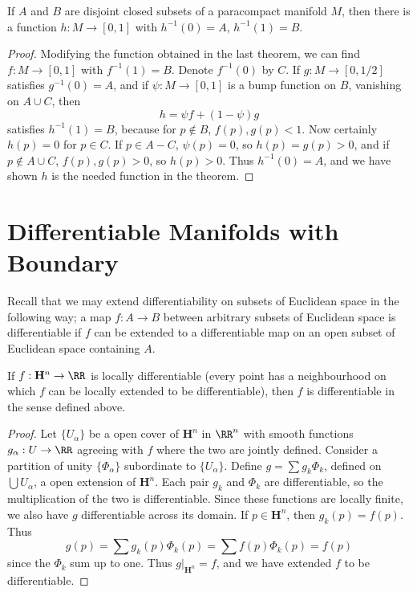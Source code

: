 \begin{corollary}
    If $A$ and $B$ are disjoint closed subsets of a paracompact manifold $M$, then there is a function $h: M \to [0,1]$ with $h^{-1}(0) = A$, $h^{-1}(1) = B$.
\end{corollary}
\begin{proof}
    Modifying the function obtained in the last theorem, we can find $f: M \to [0,1]$ with $f^{-1}(1) = B$. Denote $f^{-1}(0)$ by $C$. If $g: M \to [0,1/2]$ satisfies $g^{-1}(0) = A$, and if $\psi: M \to [0,1]$ is a bump function on $B$, vanishing on $A \cup C$, then
    \[ h = \psi f + (1 - \psi) g \]
    satisfies $h^{-1}(1) = B$, because for $p \not \in B$, $f(p), g(p) < 1$. Now certainly $h(p) = 0$ for $p \in C$. If $p \in A - C$, $\psi(p) = 0$, so $h(p) = g(p) > 0$, and if $p \not \in A \cup C$, $f(p), g(p) > 0$, so $h(p) > 0$. Thus $h^{-1}(0) = A$, and we have shown $h$ is the needed function in the theorem.
\end{proof}

\section{Differentiable Manifolds with Boundary}

Recall that we may extend differentiability on subsets of Euclidean space in the following way; a map $f: A \to B$ between arbitrary subsets of Euclidean space is differentiable if $f$ can be extended to a differentiable map on an open subset of Euclidean space containing $A$.

\begin{theorem}
    If $f:\mathbf{H}^n \to \RR$ is locally differentiable (every point has a neighbourhood on which $f$ can be locally extended to be differentiable), then $f$ is differentiable in the sense defined above.
\end{theorem}
\begin{proof}
    Let $\{ U_\alpha \}$ be a open cover of $\mathbf{H}^n$ in $\RR^n$ with smooth functions $g_\alpha:U \to \RR$ agreeing with $f$ where the two are jointly defined. Consider a partition of unity $\{ \Phi_\alpha \}$ subordinate to $\{ U_\alpha \}$. Define $g = \sum g_k \Phi_k$, defined on $\bigcup U_\alpha$, a open extension of $\mathbf{H}^n$. Each pair $g_k$ and $\Phi_k$ are differentiable, so the multiplication of the two is differentiable. Since these functions are locally finite, we also have $g$ differentiable across its domain. If $p \in \mathbf{H}^n$, then $g_k(p) = f(p)$. Thus
    \[ g(p) = \sum g_k(p) \Phi_k(p) = \sum f(p) \Phi_k(p) = f(p) \]
    since the $\Phi_k$ sum up to one. Thus $g|_{\mathbf{H}^n} = f$, and we have extended $f$ to be differentiable.
\end{proof}

